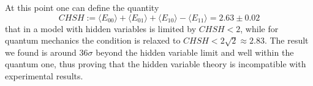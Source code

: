 \documentclass[a4paper, 11pt]{article}
\begin{document}
    At this point one can define the quantity
    \begin{equation*}
      CHSH := \langle E_{00} \rangle + \langle E_{01} \rangle + \langle E_{10} \rangle - \langle E_{11} \rangle = 2.63 \pm 0.02
    \end{equation*}
    that in a model with hidden variables is limited by $CHSH < 2$, while for quantum mechanics the condition is relaxed to $CHSH < 2\sqrt{2} \approx 2.83$. The result we found is around $36\sigma$ beyond the hidden variable limit and well within the quantum one, thus proving that the hidden variable theory is incompatible with experimental results.
\end{document}

